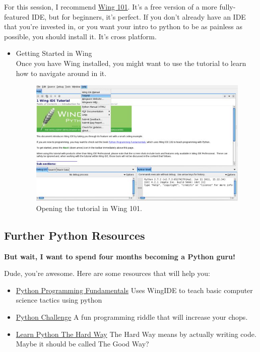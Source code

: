 \documentclass[11pt]{article}
\begin{document}
    For this session, I recommend \href{http://wingware.com/downloads/wingide-101}{Wing 101}.  It's a free version of a
    more fully-featured IDE, but for beginners, it's perfect.  If you
    don't already have an IDE that you're invested in, or you want
    your intro to python to be as painless as possible, you should
    install it.  It's cross platform.
\begin{itemize}

\item Getting Started in Wing\\
\label{sec-2-1-2-1}%
Once you have Wing installed, you might want to use the tutorial
     to learn how to navigate around in it.

     \begin{figure}[htb]
     \centering
     \includegraphics[width=.9\linewidth]{./img/tutorial.jpg}
     \caption{Opening the tutorial in Wing 101.}
     \end{figure}

\end{itemize} %
\subsection{Further Python Resources}
\label{sec-2-2}


   \textbf{But wait, I want to spend four months becoming a Python guru!}

   Dude, you're awesome.  Here are some resources that will help you:

\begin{itemize}
\item \href{http://knuth.luther.edu/~leekent/IntroToComputing/}{Python Programming Fundamentals}
     Uses WingIDE to teach basic computer science tactics using python
\item \href{http://www.pythonchallenge.com/}{Python Challenge}
     A fun programming riddle that will increase your chops.
\item \href{http://learnpythonthehardway.org/}{Learn Python The Hard Way}
     The Hard Way means by actually writing code.  Maybe it should be
     called The Good Way?
\end{itemize}
\end{document}
